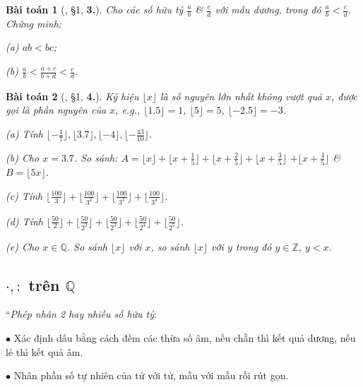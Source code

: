 \documentclass{article}
\numberwithin{equation}{section}
\newtheorem{baitoan}{Bài toán}[section]
\begin{document}
\begin{baitoan}[\cite{Binh_Toan_7_tap_1}, \S1, \textbf{3.}]
	Cho các số hữu tỷ $\frac{a}{b}$ \& $\frac{c}{d}$ với mẫu dương, trong đó $\frac{a}{b} < \frac{c}{d}$. Chứng minh:
	\begin{enumerate*}
		\item[(a)] $ab < bc$;
		\item[(b)] $\frac{a}{b} < \frac{a + c}{b + d} < \frac{c}{d}$.
	\end{enumerate*}
\end{baitoan}

\begin{baitoan}[\cite{Binh_Toan_7_tap_1}, \S1, \textbf{4.}]
	Ký hiệu $\lfloor x\rfloor$ là số nguyên lớn nhất không vượt quá $x$, được gọi là \emph{phần nguyên} của $x$, e.g., $\lfloor 1.5\rfloor = 1$, $\lfloor 5\rfloor = 5$, $\lfloor -2.5\rfloor = -3$.
	\begin{enumerate*}
		\item[(a)] Tính $\lfloor-\frac{1}{7}\rfloor,\lfloor 3.7\rfloor,\lfloor-4\rfloor,\lfloor-\frac{43}{10}\rfloor$.
		\item[(b)] Cho $x = 3.7$. So sánh: $A = \lfloor x\rfloor + \lfloor x + \frac{1}{5}\rfloor + \lfloor x + \frac{2}{5}\rfloor + \lfloor x + \frac{3}{5}\rfloor$ $+ \lfloor x + \frac{4}{5}\rfloor$ \& $B = \lfloor 5x\rfloor$.
		\item[(c)] Tính $ \lfloor\frac{100}{3}\rfloor + \lfloor\frac{100}{3^2}\rfloor + \lfloor\frac{100}{3^3}\rfloor + \lfloor\frac{100}{3^4}\rfloor$.
		\item[(d)] Tính $ \lfloor\frac{50}{2}\rfloor + \lfloor\frac{50}{2^2}\rfloor + \lfloor\frac{50}{2^3}\rfloor + \lfloor\frac{50}{2^4}\rfloor + \lfloor\frac{50}{2^5}\rfloor$.
		\item[(e)] Cho $x\in\mathbb{Q}$. So sánh $\lfloor x\rfloor$ với $x$, so sánh $\lfloor x\rfloor$ với $y$ trong đó $y\in\mathbb{Z}$, $y < x$.
	\end{enumerate*}
\end{baitoan}


\subsection{$\cdot,:$ trên $\mathbb{Q}$}
``\textit{Phép nhân 2 hay nhiều số hữu tỷ}:
\begin{enumerate*}
	\item[$\bullet$] Xác định dấu bằng cách đếm các thừa số âm, nếu chẵn thì kết quả dương, nếu lẻ thì kết quả âm.
	\item[$\bullet$] Nhân phần số tự nhiên của tử với tử, mẫu với mẫu rồi rút gọn.
\end{enumerate*}
\end{document}
